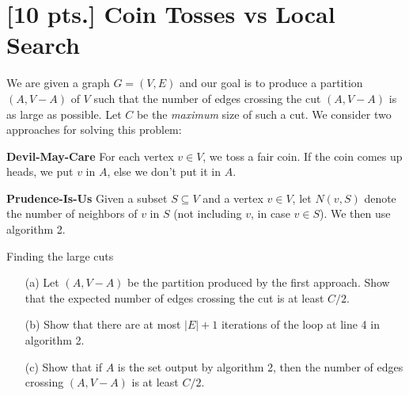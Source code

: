 \documentclass[11pt]{article}
\begin{document}
\newpage

\section{[10 pts.] Coin Tosses vs Local Search}

We are given a graph $G = (V,E)$ and our goal is to produce a partition
$(A,V-A)$ of $V$ such that the number of edges crossing the cut $(A,V-A)$
is as large as possible. Let $C$ be the \emph{maximum} size of such a cut. We
consider two approaches for solving this problem:

{\bf Devil-May-Care} For each vertex $v \in V$, we toss a fair coin. If the coin
comes up heads, we put $v$ in $A$, else we don't put it in $A$. 

{\bf Prudence-Is-Us} Given a subset $S\subseteq V$ and a vertex $v \in V$, let
$N(v,S)$ denote the number of neighbors of $v$ in $S$ (not including $v$, 
in case $v \in S$). We then use algorithm 2.

\begin{algorithm}
  \caption{Finding the large cuts}
  \begin{algorithmic}
    \Repeat
    \EndIf
  \end{algorithmic}
\end{algorithm}

\begin{itemize}
  \item[(a)] Let $(A,V-A)$ be the partition produced by the first approach.
    Show that the expected number of edges crossing the cut is at least $C/2$.


  \item[(b)] Show that there are at most $|E|+1$ iterations of the loop at
    line 4 in algorithm 2.


  \item[(c)] Show that if $A$ is the set output by algorithm 2, then the number 
    of edges crossing $(A,V-A)$ is at least $C/2$.
\end{itemize}
\end{document}
